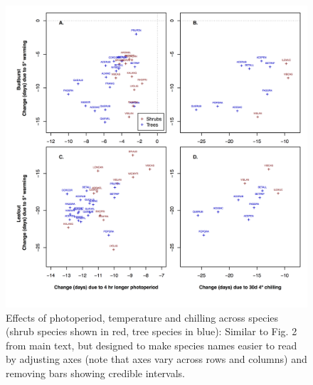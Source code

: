 \documentclass{article}
\begin{document}
\begin{figure}
\label{fig:figS5}
\includegraphics[width=1\textwidth]{Fig2_4panel_ZoomSupp.png}
\caption{Effects of photoperiod, temperature and chilling across species (shrub species shown in red, tree species in blue): Similar to Fig. 2 from main text, but designed to make species names easier to read by adjusting axes (note that axes vary across rows and columns) and removing bars showing credible intervals. }
\end{figure}
\end{document}
